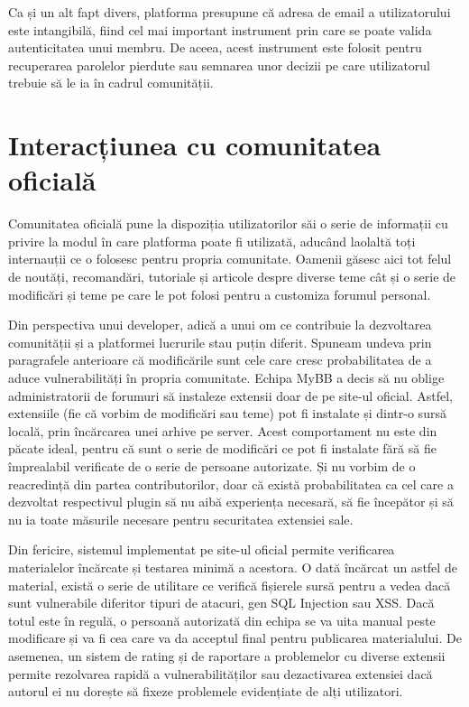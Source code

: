 Ca și un alt fapt divers, platforma presupune că adresa de email a utilizatorului este intangibilă, fiind cel mai important instrument prin care se poate valida autenticitatea unui membru. De aceea, acest instrument este folosit pentru recuperarea parolelor pierdute sau semnarea unor decizii pe care utilizatorul trebuie să le ia în cadrul comunității.

\section{Interacțiunea cu comunitatea oficială}

Comunitatea oficială pune la dispoziția utilizatorilor săi o serie de informații cu privire la modul în care platforma poate fi utilizată, aducând laolaltă toți internauții ce o folosesc pentru propria comunitate. Oamenii găsesc aici tot felul de noutăți, recomandări, tutoriale și articole despre diverse teme cât și o serie de modificări și teme pe care le pot folosi pentru a customiza forumul personal.

Din perspectiva unui developer, adică a unui om ce contribuie la dezvoltarea comunității și a platformei lucrurile stau puțin diferit. Spuneam undeva prin paragrafele anterioare că modificările sunt cele care cresc probabilitatea de a aduce vulnerabilități în propria comunitate. Echipa MyBB a decis să nu oblige administratorii de forumuri să instaleze extensii doar de pe site-ul oficial. Astfel, extensiile (fie că vorbim de modificări sau teme) pot fi instalate și dintr-o sursă locală, prin încărcarea unei arhive pe server. Acest comportament nu este din păcate ideal, pentru că sunt o serie de modificări ce pot fi instalate fără să fie împrealabil verificate de o serie de persoane autorizate. Și nu vorbim de o reacredință din partea contributorilor, doar că există probabilitatea ca cel care a dezvoltat respectivul plugin să nu aibă experiența necesară, să fie începător și să nu ia toate măsurile necesare pentru securitatea extensiei sale.

Din fericire, sistemul implementat pe site-ul oficial permite verificarea materialelor încărcate și testarea minimă a acestora. O dată încărcat un astfel de material, există o serie de utilitare ce verifică fișierele sursă pentru a vedea dacă sunt vulnerabile diferitor tipuri de atacuri, gen SQL Injection sau XSS. Dacă totul este în regulă, o persoană autorizată din echipa se va uita manual peste modificare și va fi cea care va da acceptul final pentru publicarea materialului. De asemenea, un sistem de rating și de raportare a problemelor cu diverse extensii permite rezolvarea rapidă a vulnerabilităților sau dezactivarea extensiei dacă autorul ei nu dorește să fixeze problemele evidențiate de alți utilizatori.